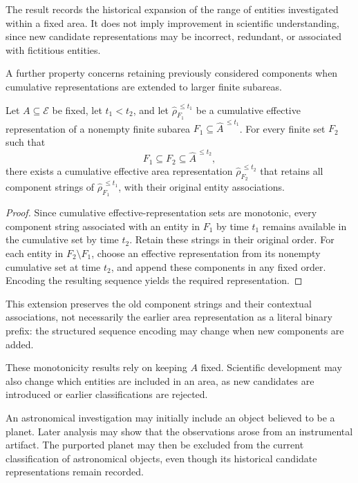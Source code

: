 The result records the historical expansion of the range of entities investigated within a fixed area. It does not imply improvement in scientific understanding, since new candidate representations may be incorrect, redundant, or associated with fictitious entities.

A further property concerns retaining previously considered components when cumulative representations are extended to larger finite subareas.

\begin{proposition}
Let $A\subseteq\mathcal E$ be fixed, let $t_1<t_2$, and let $\hat\rho_{F_1}^{\,\leq t_1}$ be a cumulative effective representation of a nonempty finite subarea $F_1\subseteq\hat A^{\,\leq t_1}$. For every finite set $F_2$ such that
\[
F_1\subseteq F_2\subseteq\hat A^{\,\leq t_2},
\]
there exists a cumulative effective area representation $\hat\rho_{F_2}^{\,\leq t_2}$ that retains all component strings of $\hat\rho_{F_1}^{\,\leq t_1}$, with their original entity associations.
\end{proposition}
\begin{proof}
Since cumulative effective-representation sets are monotonic, every component string associated with an entity in $F_1$ by time $t_1$ remains available in the cumulative set by time $t_2$. Retain these strings in their original order. For each entity in $F_2\setminus F_1$, choose an effective representation from its nonempty cumulative set at time $t_2$, and append these components in any fixed order. Encoding the resulting sequence yields the required representation.
\end{proof}

This extension preserves the old component strings and their contextual associations, not necessarily the earlier area representation as a literal binary prefix: the structured sequence encoding may change when new components are added.

These monotonicity results rely on keeping $A$ fixed. Scientific development may also change which entities are included in an area, as new candidates are introduced or earlier classifications are rejected.

\begin{example}
An astronomical investigation may initially include an object believed to be a planet. Later analysis may show that the observations arose from an instrumental artifact. The purported planet may then be excluded from the current classification of astronomical objects, even though its historical candidate representations remain recorded.
\end{example}

